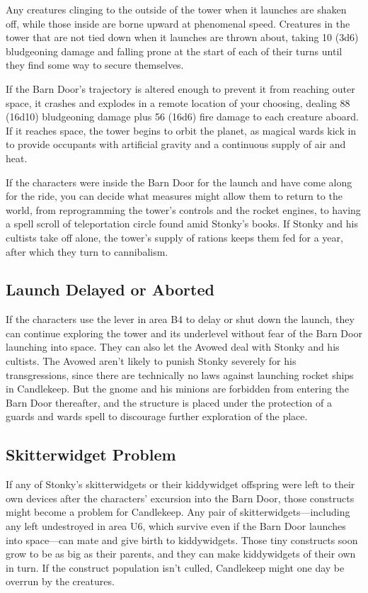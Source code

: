 \documentclass[10pt,a4paper,twoside,bg=print,twocolumn,openany,nodeprecatedcode]{dndbook}
\begin{document}
Any creatures clinging to the outside of the tower when it launches are shaken off, while those inside are borne upward at phenomenal speed. Creatures in the tower that are not tied down when it launches are thrown about, taking 10 (3d6) bludgeoning damage and falling prone at the start of each of their turns until they find some way to secure themselves.

If the Barn Door's trajectory is altered enough to prevent it from reaching outer space, it crashes and explodes in a remote location of your choosing, dealing 88 (16d10) bludgeoning damage plus 56 (16d6) fire damage to each creature aboard. If it reaches space, the tower begins to orbit the planet, as magical wards kick in to provide occupants with artificial gravity and a continuous supply of air and heat.

If the characters were inside the Barn Door for the launch and have come along for the ride, you can decide what measures might allow them to return to the world, from reprogramming the tower's controls and the rocket engines, to having a spell scroll of teleportation circle found amid Stonky's books. If Stonky and his cultists take off alone, the tower's supply of rations keeps them fed for a year, after which they turn to cannibalism.

\subsection{Launch Delayed or Aborted}
If the characters use the lever in area B4 to delay or shut down the launch, they can continue exploring the tower and its underlevel without fear of the Barn Door launching into space. They can also let the Avowed deal with Stonky and his cultists. The Avowed aren't likely to punish Stonky severely for his transgressions, since there are technically no laws against launching rocket ships in Candlekeep. But the gnome and his minions are forbidden from entering the Barn Door thereafter, and the structure is placed under the protection of a guards and wards spell to discourage further exploration of the place.

\subsection{Skitterwidget Problem}
If any of Stonky's skitterwidgets or their kiddywidget offspring were left to their own devices after the characters' excursion into the Barn Door, those constructs might become a problem for Candlekeep. Any pair of skitterwidgets—including any left undestroyed in area U6, which survive even if the Barn Door launches into space—can mate and give birth to kiddywidgets. Those tiny constructs soon grow to be as big as their parents, and they can make kiddywidgets of their own in turn. If the construct population isn't culled, Candlekeep might one day be overrun by the creatures.
\end{document}
